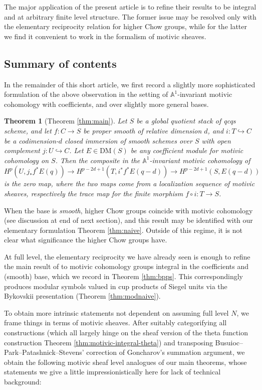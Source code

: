 \documentclass[a4paper,reqno,11pt]{amsart}
\theoremstyle{plain}
\newtheorem{theorem}{Theorem}[section]
\theoremstyle{definition}
\theoremstyle{remark}
\newcommand{\A}{\mathbb{A}}
\newcommand{\DM}{\mathrm{DM}}
\begin{document}
The major application of the present article is to refine their results to be integral and at arbitrary finite level structure. The former issue may be resolved only with the elementary reciprocity relation for higher Chow groups, while for the latter we find it convenient to work in the formalism of motivic sheaves.

\subsection{Summary of contents}

In the remainder of this short article, we first record a slightly more sophisticated formulation of the above observation in the setting of $\A^1$-invariant motivic cohomology with coefficients, and over slightly more general bases. 

\begin{theorem}[Theorem \ref{thm:main}]
    Let $S$ be a global quotient stack of qcqs scheme, and let $f:C\to S$ be proper smooth of relative dimension $d$, and $i:T\hookrightarrow C$ be a codimension-$d$ closed immersion of smooth schemes over $S$ with open complement $j:U\hookrightarrow C$. Let $E\in \DM(S)$ be any coefficient module for motivic cohomology on $S$. Then the composite in the $\A^1$-invariant motivic cohomology of \cite{BEM}
    \[
    H^p(U,j_*f^*E(q))\to H^{p-2d+1}(T,i^* f^*E(q-d))\to  H^{p-2d+1}(S,E(q-d))
    \]
    is the zero map, where the two maps come from a localization sequence of motivic sheaves, respectively the trace map for the finite morphism $f\circ i:T\to S$.
\end{theorem}

When the base is \emph{smooth}, higher Chow groups coincide with motivic cohomology (see discussion at end of next section), and this result may be identified with our elementary formulation Theorem \ref{thm:naive}. Outside of this regime, it is not clear what significance the higher Chow groups have.

At full level, the elementary reciprocity we have already seen is enough to refine the main result of \cite{BPPS} to motivic cohomology groups integral in the coefficients and (smooth) base, which we record in Theorem \ref{thm:bpps}. This correspondingly produces modular symbols valued in cup products of Siegel units via the Bykovskii presentation (Theorem \ref{thm:modnaive}). 

To obtain more intrinsic statements not dependent on assuming full level $N$, we frame things in terms of motivic sheaves. After suitably categorifying all constructions (which all largely hinge on the sheaf version of the theta function construction Theorem \ref{thm:motivic-integral-theta}) and transposing Busuioc--Park--Patashnick--Stevens' correction of Goncharov's summation argument, we obtain the following motivic sheaf level analogues of our main theorems, whose statements we give a little impressionistically here for lack of technical background:
\end{document}

